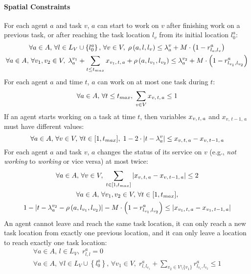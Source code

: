 \paragraph{Spatial Constraints}
For each agent $a$ and task $v$, $a$ can start to work on $v$ after finishing work on a
previous task, or after reaching the task location $l_v$ from its initial location
$l^a_0$:
\begin{gather}
    \forall a \in A,\, \forall l \in L_V \cup \left\{ l_0^a \right\},\, \forall v \in V,\;
    \rho \left(a, l, l_v \right) \leq \lambda^v_a + M \cdot \left( 1 - r^a_{l_a, l_v}
    \right)\label{eq:mip4}\\
    \forall a \in A,\, \forall v_1, v_2 \in V,\;
    \lambda^{v_1}_a + \sum_{t \leq t_{max}} x_{v_1,\, t,\, a} + \rho\left(a, l_{v_1},
    l_{v_2}\right) \leq \lambda^{v_2}_a + M \cdot \left( 1 - r^a_{l_{v_1}, l_{v_2}}
    \right)\label{eq:mip5}
\end{gather}
For each agent $a$ and time $t$, $a$ can work on at most one task during $t$:
\begin{equation}\label{eq:mip6}
    \forall a \in A,\, \forall t \leq t_{max},\; \sum_{v \in V} x_{v,\, t,\, a} \leq 1
\end{equation}
If an agent starts working on a task at time $t$, then variables $x_{v,\, t,\, a}$ and $x_{v,\, t -
1,\, a}$ must have different values:
\begin{equation}\label{eq:mip7}
    \forall a \in A,\, \forall v \in V,\, \forall t \in [1, t_{max}],\;
    1 - 2 \cdot \left| t - \lambda^v_a \right| \leq x_{v,\, t,\, a} - x_{v,\, t - 1,\, a}
\end{equation}
For each agent $a$ and task $v$, $a$ changes the status of its service on $v$ (e.g.,
\emph{not working} to \emph{working} or vice versa) at most twice:
\begin{gather}
    \forall a \in A,\, \forall v \in V,\;
    \sum_{t \in [1, t_{max}]} \left| x_{v,\, t,\, a} - x_{v,\, t - 1,\, a} \right| \leq
    2\label{eq:mip8}\\
    \begin{gathered}
    \forall a \in A,\, \forall v_1, v_2 \in V,\, \forall t \in [1, t_{max}],\\ 1 - \left| t
    - \lambda^{v_2}_a - \rho \left( a, l_{v_1}, l_{v_2} \right) \right| - M \cdot \left( 1
    - r^a_{l_{v_1}, l_{v_2}} \right) \leq \left| x_{v_1,\, t,\, a} - x_{v_1,\, t - 1,\, a}
    \right|
    \end{gathered}\label{eq:mip9}
\end{gather}
An agent cannot leave and reach the same task location, it can only reach a new task
location from exactly one previous location, and it can only leave a location to
reach exactly one task location:
\begin{gather}
    \forall a \in A,\, l \in L_V,\; r^a_{l, l} = 0\label{eq:mip10}\\
    \forall a \in A,\, \forall l \in L_V \cup \left\{ l^a_0 \right\},\, \forall v_1 \in
    V,\; r^a_{l, l_{v_1}} + \sum_{v_2 \in V \setminus \{ v_1 \}} r^a_{l_{v_1}, l_{v_2}}
    \leq 1\label{eq:mip11}
\end{gather}


